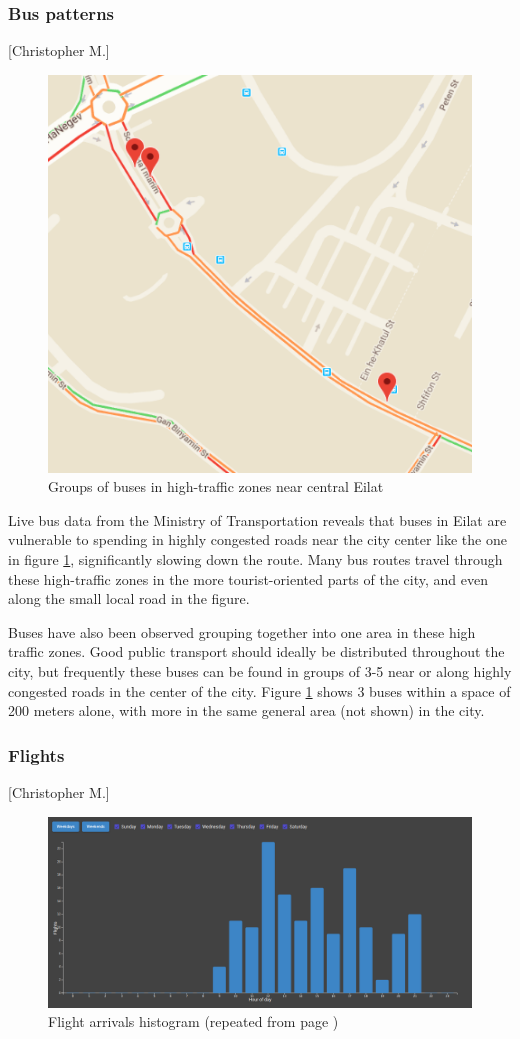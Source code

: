 \documentclass[12pt]{article}                               %
\newcommand{\repeatcaption}[2]{                             %
  \renewcommand{\thefigure}{\ref{#1}}
  \captionsetup{list=no}
  \caption{#2 (repeated from page \pageref{#1})}
}
\begin{document}
\subsubsection{Bus patterns}[Christopher M.]
\begin{figure}[H]
    \centering
    \includegraphics[width=0.6\columnwidth]{images/bus_clump_1.png}
    \caption{Groups of buses in high-traffic zones near central Eilat}
    \label{img:bus_clump_1}
\end{figure}

Live bus data from the Ministry of Transportation reveals that buses in Eilat are vulnerable to spending in highly congested roads near the city center like the one in figure \ref{img:bus_clump_1}, significantly slowing down the route. Many bus routes travel through these high-traffic zones in the more tourist-oriented parts of the city, and even along the small local road in the figure.

Buses have also been observed grouping together into one area in these high traffic zones. Good public transport should ideally be distributed throughout the city, but frequently these buses can be found in groups of 3-5 near or along highly congested roads in the center of the city. Figure \ref{img:bus_clump_1} shows 3 buses within a space of 200 meters alone, with more in the same general area (not shown) in the city.



\subsubsection{Flights}[Christopher M.]
\begin{figure}[H]
    \centering
    \includegraphics[width=1\columnwidth]{images/site_flights_graph.png}
    \repeatcaption{img:site_flights_histogram}{Flight arrivals histogram}
\end{figure}
\end{document}

